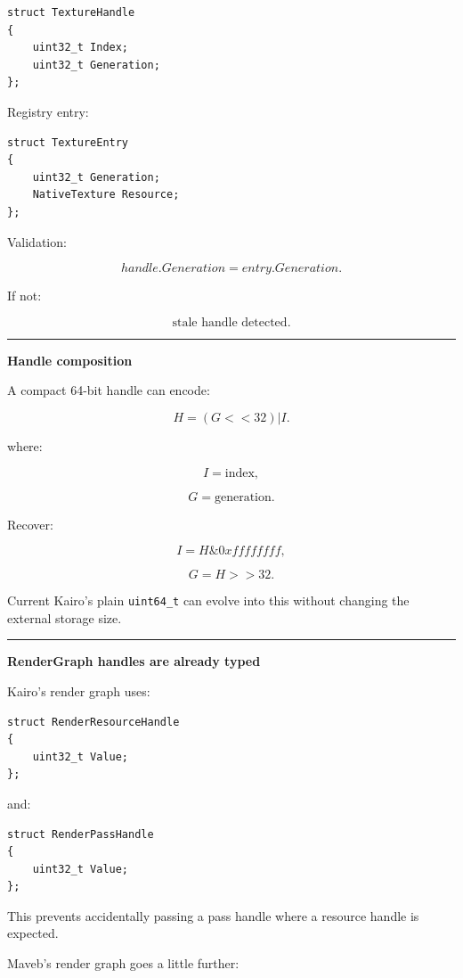 \begin{verbatim}
struct TextureHandle
{
    uint32_t Index;
    uint32_t Generation;
};
\end{verbatim}

Registry entry:

\begin{verbatim}
struct TextureEntry
{
    uint32_t Generation;
    NativeTexture Resource;
};
\end{verbatim}

Validation:

\[
handle.Generation
=
entry.Generation.
\]

If not:

\[
\boxed{\text{stale handle detected}.}
\]

\begin{center}\rule{0.5\linewidth}{0.5pt}\end{center}

\textbf{Handle composition}

A compact 64-bit handle can encode:

\[
H=
(G<<32)|I.
\]

where:

\[
I=\text{index},
\]

\[
G=\text{generation}.
\]

Recover:

\[
I=H\&0xffffffff,
\]

\[
G=H>>32.
\]

Current Kairo's plain \texttt{uint64\_t} can evolve into this without changing the external storage size.

\begin{center}\rule{0.5\linewidth}{0.5pt}\end{center}

\textbf{RenderGraph handles are already typed}

Kairo's render graph uses:

\begin{verbatim}
struct RenderResourceHandle
{
    uint32_t Value;
};
\end{verbatim}

and:

\begin{verbatim}
struct RenderPassHandle
{
    uint32_t Value;
};
\end{verbatim}

This prevents accidentally passing a pass handle where a resource handle is expected.

Maveb's render graph goes a little further:

